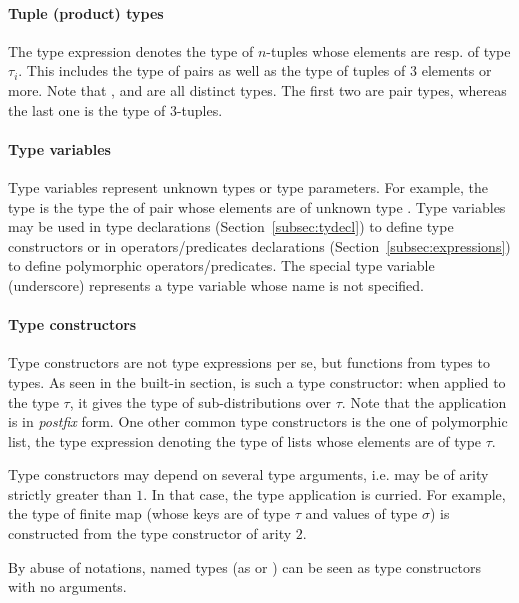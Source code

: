 \paragraph{Tuple (product) types}
The type expression  denotes the
type of $n$-tuples whose elements are resp. of type $\tau_i$. This
includes the type of pairs as well as the type of tuples of $3$ elements
or more.
%
Note that ,  and
 are all distinct types. The first two
are pair types, whereas the last one is the type of $3$-tuples.

\paragraph{Type variables}
Type variables represent unknown types or type parameters. For example,
the type  is the type the of pair whose elements
are of unknown type . Type variables may be used in type declarations
(Section~\ref{subsec:tydecl}) to define type constructors or in
operators/predicates declarations (Section~\ref{subsec:expressions}) to define
polymorphic operators/predicates. The special type variable \ec{_}
(underscore) represents a type variable whose name is not specified.

\paragraph{Type constructors}

Type constructors are not type expressions per se, but functions from
types to types. As seen in the built-in section,  is such
a type constructor: when applied to the type $\tau$, it gives the
type  of sub-distributions over $\tau$. Note that the
application is in \emph{postfix} form. One other common type constructors
is the one  of polymorphic list, the type expression
 denoting the type of lists whose elements are of type $\tau$.

Type constructors may depend on several type arguments, i.e. may be
of arity strictly greater than $1$. In that case,
the type application is curried. For example, the type of finite map
 (whose keys are of type $\tau$ and values of
type $\sigma$) is constructed from the type constructor  of
arity $2$.

By abuse of notations, named types (as  or ) can be seen
as type constructors with no arguments.

